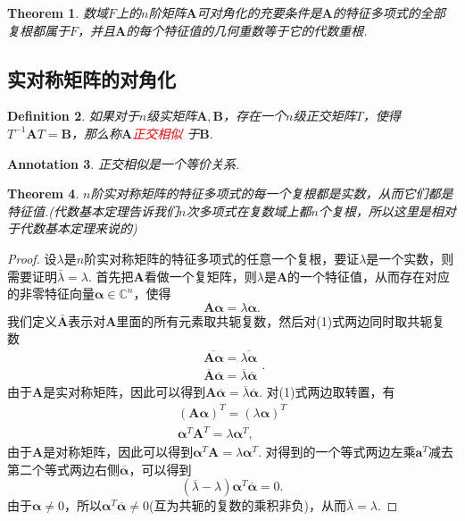 \documentclass{article}
\newtheorem{theorem}{Theorem}[section]
\newtheorem{definition}[theorem]{Definition}
\newtheorem{annotation}[theorem]{Annotation}
\newcommand{\mbf}[1]{\bm{#1}}
\newcommand{\redt}[1]{\textcolor{red}{#1}}
\begin{document}
\begin{theorem}
\rm 数域$F$上的$n$阶矩阵$\mbf{A}$可对角化的充要条件是$\mbf{A}$的特征多项式的全部复根都属于$F$，并且$\mbf{A}$的每个特征值的几何重数等于它的代数重根.
\end{theorem}

\newpage
\subsection{实对称矩阵的对角化}

\begin{definition}
\rm 如果对于$n$级实矩阵$\mbf{A},\mbf{B}$，存在一个$n$级正交矩阵$T$，使得$T^{-1}\mbf{A}T=\mbf{B}$，那么称$\mbf{A}$\redt{正交相似
}于$\mbf{B}$.
\end{definition}

\begin{annotation}
\rm 正交相似是一个等价关系.
\end{annotation}

\begin{theorem}\label{symmetry: real}
\rm $n$阶实对称矩阵的特征多项式的每一个复根都是实数，从而它们都是特征值.({\color{blue}代数基本定理告诉我们$n$次多项式在复数域上都$n$个复根，所以这里是相对于代数基本定理来说的})
\end{theorem}

\begin{proof}
\rm 设$\lambda$是$n$阶实对称矩阵的特征多项式的任意一个复根，要证$\lambda$是一个实数，则需要证明$\bar{\lambda} = \lambda$. 首先把$\mbf{A}$看做一个复矩阵，则$\lambda$是$\mbf{A}$的一个特征值，从而存在对应的非零特征向量$\mbf{\alpha}\in \mathbb{C}^n$，使得
\begin{equation}
\mbf{A}\mbf{\alpha} = \lambda\mbf{\alpha}.
\end{equation}
我们定义$\bar{\mbf{A}}$表示对$\mbf{A}$里面的所有元素取共轭复数，然后对(1)式两边同时取共轭复数
$$
\begin{array}{ll}
\overline{\mbf{A}\mbf{\alpha}} = \overline{\lambda\mbf{\alpha}} \\
\overline{\mbf{A}}\overline{\mbf{\alpha}} = \overline{\lambda}\overline{\mbf{\alpha}}
\end{array}.
$$
由于$\mbf{A}$是实对称矩阵，因此可以得到$\mbf{A}\overline{\mbf{\alpha}} = \overline{\lambda}\overline{\mbf{\alpha}}$. 对(1)式两边取转置，有
$$
\begin{array}{ll}
(\mbf{A}\mbf{\alpha})^T = (\lambda\mbf{\alpha})^T\\
\mbf{\alpha}^T\mbf{A}^T = \lambda\mbf{\alpha}^T,
\end{array}
$$
由于$\mbf{A}$是对称矩阵，因此可以得到$\mbf{\alpha}^T\mbf{A} = \lambda\mbf{\alpha}^T$. 对得到的一个等式两边左乘$\mbf{a}^T$减去第二个等式两边右侧$\overline{\mbf{\alpha}}$，可以得到
$$
(\overline{\lambda}-\lambda)\mbf{\alpha}^T\overline{\mbf{\alpha}} = 0.
$$
由于$\mbf{\alpha} \neq 0$，所以$\mbf{\alpha}^T\overline{\mbf{\alpha}} \neq 0$(互为共轭的复数的乘积非负)，从而$\overline{\lambda} = \lambda$.
\end{proof}
\end{document}
